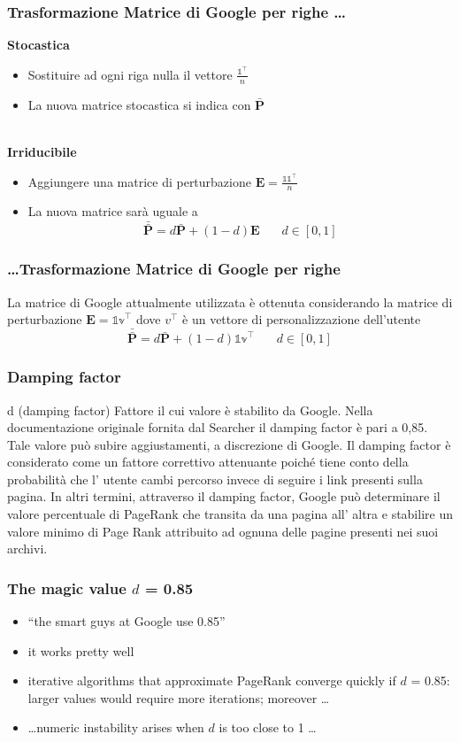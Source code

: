 \documentclass{beamer}
\begin{document}
\begin{frame}
	\frametitle{Trasformazione Matrice di Google per righe \dots}
	\textbf{Stocastica}
		\begin{itemize}
			\item Sostituire ad ogni riga nulla il vettore $\frac{\mathbb{1}^\intercal}{n}$
			\item La nuova matrice stocastica si indica con $\bar{\textbf{P}}$\\~\\
		\end{itemize}
	\textbf{Irriducibile}
		\begin{itemize}
			\item Aggiungere una matrice di perturbazione $\textbf{E} = \frac{\mathbb{11}^\intercal}{n}$
			\item La nuova matrice sarà uguale a  $$\bar{\bar{\textbf{P}}} = d\bar{\textbf{P}} + (1-d)\textbf{E} ~~~~~~~~ d \in [0,1]$$
		\end{itemize}
\end{frame}

\begin{frame}
	\frametitle{\dots Trasformazione Matrice di Google per righe}
	La matrice di Google attualmente utilizzata è ottenuta considerando la matrice di perturbazione  $\textbf{E} = \mathbb{1v}^\intercal$ dove $v^\intercal$ è un vettore di personalizzazione dell'utente $$\bar{\bar{\textbf{P}}} = d\bar{\textbf{P}} + (1-d)\mathbb{1v}^\intercal ~~~~~~~~ d \in [0,1]$$
\end{frame}
\begin{frame}
	\frametitle{Damping factor}
d (damping factor) 
Fattore il cui valore è stabilito da Google. Nella documentazione originale fornita dal Searcher il damping factor è pari a 0,85. Tale valore può subire aggiustamenti, a discrezione di Google. Il damping factor è considerato come un fattore correttivo attenuante poiché tiene conto della probabilità che l' utente cambi percorso invece di seguire i link presenti sulla pagina. In altri termini, attraverso il damping factor, Google può determinare il valore percentuale di PageRank che transita da una pagina all' altra e stabilire un valore minimo di Page Rank attribuito ad ognuna delle pagine presenti nei suoi archivi.
\end{frame}

\begin{frame}
	\frametitle{The magic value $d$ = 0.85}
	\begin{itemize}
		\item ``the smart guys at Google use 0.85''
		\item  it works pretty well
		\item  iterative algorithms that approximate PageRank converge
		quickly if $d$ = 0.85: larger values would require more
		iterations; moreover \dots
		\item \dots numeric instability arises when $d$ is too close to 1 \dots
		
	\end{itemize}
\end{frame}
\end{document}
